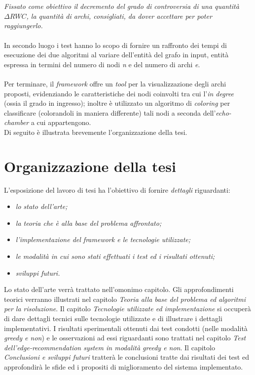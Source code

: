 \\\\
\textit{Fissato come obiettivo il decremento del grado di controversia di una quantità $\Delta RWC$, la quantità di archi, consigliati, da dover accettare per poter raggiungerlo.}
\\\\
In secondo luogo i test hanno lo scopo di fornire un raffronto dei tempi di esecuzione dei due algoritmi al variare dell'entità del grafo in input, entità espressa in termini del numero di nodi \textit{n} e del numero di archi \textit{e}.
\\\\Per terminare, il \textit{framework} offre un \textit{tool} per la visualizzazione degli archi proposti, evidenziando le caratteristiche dei nodi coinvolti tra cui l'\textit{in degree} (ossia il grado in ingresso); inoltre è utilizzato un algoritmo di \textit{coloring} per classificare (colorandoli in maniera differente) tali nodi a seconda dell'\textit{echo-chamber} a cui appartengono.
\\Di seguito è illustrata brevemente l'organizzazione della tesi.
\section{Organizzazione della tesi}
\label{sec:organizzazione}
L'esposizione del lavoro di tesi ha l'obiettivo di fornire \textit{dettagli} riguardanti:
\begin{itemize}
\item \textit{lo stato dell'arte;}
\item \textit{la teoria che è alla base del problema affrontato;}
\item \textit{l'implementazione del framework e le tecnologie utilizzate;}
\item \textit{le modalità in cui sono stati effettuati i test ed i risultati ottenuti;}
\item \textit{sviluppi futuri.}
\end{itemize}
Lo stato dell'arte verrà trattato nell'omonimo capitolo. Gli approfondimenti teorici verranno illustrati nel capitolo \textit{Teoria alla base del problema ed algoritmi per la risoluzione}. Il capitolo \textit{Tecnologie utilizzate ed implementazione} si occuperà di dare dettagli tecnici sulle tecnologie utilizzate e di illustrare i dettagli implementativi. I risultati sperimentali ottenuti dai test condotti (nelle modalità \textit{greedy e non}) e le osservazioni ad essi riguardanti sono trattati nel capitolo \textit{Test dell'edge-recommendation system in modalità greedy e non}. Il capitolo \textit{Conclusioni e sviluppi futuri} tratterà le conclusioni tratte dai risultati dei test ed approfondirà le sfide ed i propositi di miglioramento del sistema implementato.

